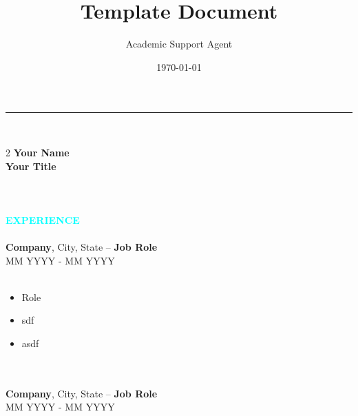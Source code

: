 \documentclass{article}
\title{Template Document}
\author{Academic Support Agent}
\date{\today}
\begin{document}
\maketitle

\noindent
\textcolor{orange}{\rule{\dimexpr\linewidth}{10pt}}%
\\
    \begin{multicols}{2} %
    \noindent
    \textbf{\fontsize{20}{24}\selectfont Your Name} \\
    \noindent
    \textbf{\fontsize{12}{24}\selectfont\textcolor[RGB]{80,80,80}{ Your Title}}
    \\
    \vspace{10pt}
    \\
    \lipsum[1]
    \\
    \vspace{10pt}
    \\
    \textbf{\fontsize{16}{24}\selectfont\textcolor{cyan} {EXPERIENCE}}
    \\
    \vspace{10pt}
    \\
    \textbf{\fontsize{14}{24}\selectfont Company}, City, State -- \textbf{\fontsize{14}{24}\selectfont Job Role}\\
    MM YYYY - MM YYYY \\
    \vspace{1pt}
    \\
    \begin{minipage}{200pt}
        \begin{itemize}
            \setlength\itemsep{0.001em} %
            \setlength\parsep{0.001em} %
            \item Role 
            \item sdf 
            \item asdf
        \end{itemize}
    \end{minipage}
    \\
    \vspace{20pt}
    \\
    \textbf{\fontsize{14}{24}\selectfont Company}, City, State -- \textbf{\fontsize{14}{24}\selectfont Job Role}\\
    MM YYYY - MM YYYY \\
    \vspace{1pt}
    \\

\end{multicols}
\end{document}
